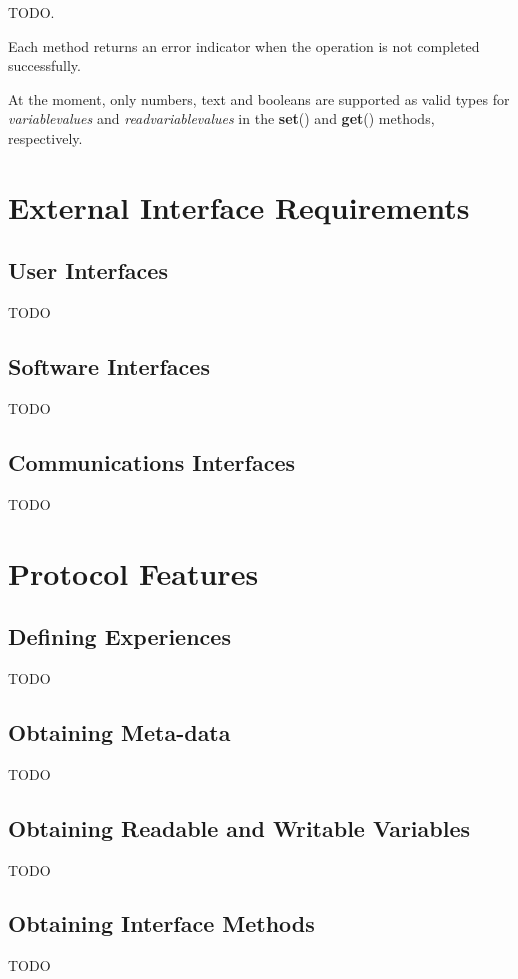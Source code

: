 TODO.

Each method returns an error indicator when the operation is not completed successfully.

At the moment, only numbers, text and booleans are supported as valid types for \textit{variablevalues} and \textit{readvariablevalues} in the \textbf{set}() and \textbf{get}() methods, respectively.


\chapter{External Interface Requirements}
\label{External Interface Requirements}

\section{User Interfaces}
TODO

\section{Software Interfaces}
TODO

\section{Communications Interfaces}
TODO


\chapter{Protocol Features}
\label{System Features}

\section{Defining Experiences}
TODO

\section{Obtaining Meta-data}
TODO

\section{Obtaining Readable and Writable Variables}
TODO

\section{Obtaining Interface Methods}
TODO

